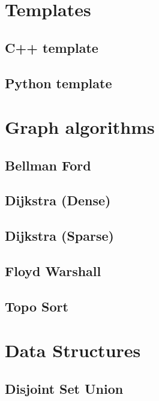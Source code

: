 \section{Templates}
\subsection{C++ template}
\raggedbottom
\hrulefill
\subsection{Python template}
\raggedbottom
\hrulefill

\section{Graph algorithms}
\subsection{Bellman Ford}
\raggedbottom
\hrulefill
\subsection{Dijkstra (Dense)}
\raggedbottom
\hrulefill
\subsection{Dijkstra (Sparse)}
\raggedbottom
\hrulefill
\subsection{Floyd Warshall}
\raggedbottom
\hrulefill
\subsection{Topo Sort}
\raggedbottom
\hrulefill

\section{Data Structures}
\subsection{Disjoint Set Union}
\raggedbottom
\hrulefill
